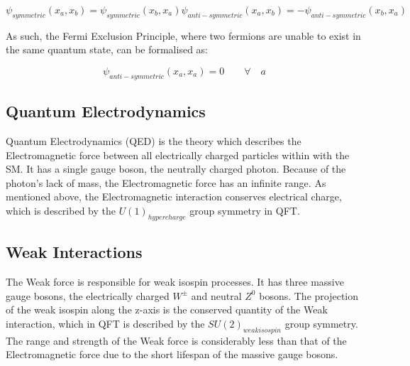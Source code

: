 \begin{equation}
\psi_{symmetric}(x_{a},x_{b}) = \psi_{symmetric}(x_{b},x_{a})
\psi_{anti-symmetric}(x_{a},x_{b}) = -\psi_{anti-symmetric}(x_{b},x_{a})
\end{equation}

As such, the Fermi Exclusion Principle, where two fermions are unable to exist in the same quantum state, can be formalised as\cite{QM}:

\begin{equation}
\psi_{anti-symmetric}(x_{a},x_{a}) = 0 \qquad \forall \quad a
\end{equation}

\subsection{Quantum Electrodynamics}\label{subsec:QED}
Quantum Electrodynamics (QED) is the theory which describes the Electromagnetic force between all electrically charged particles within with the SM. 
It has a single gauge boson, the neutrally charged photon. 
Because of the photon's lack of mass, the Electromagnetic force has an infinite range. 
As mentioned above, the Electromagnetic interaction conserves electrical charge, which is described by the $U(1)_{hypercharge}$ group symmetry in QFT\cite{QFT}. 

\subsection{Weak Interactions}\label{subsec:weakForce}
The Weak force is responsible for weak isospin processes. 
It has three massive gauge bosons, the electrically charged $W^{\pm}$ and neutral $Z^{0}$ bosons. 
The projection of the weak isospin along the z-axis is the conserved quantity of the Weak interaction, which in QFT is described by the $SU(2)_{weak isospin}$ group symmetry. 
The range and strength of the Weak force is considerably less than that of the Electromagnetic force due to the short lifespan of the massive gauge bosons\cite{ElectroweakStrong}. 

